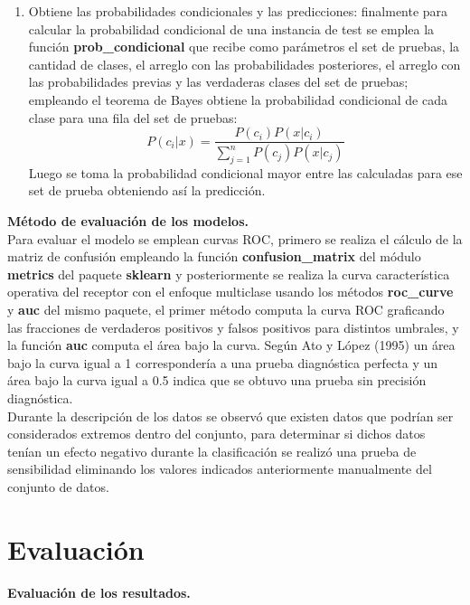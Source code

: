 \begin{enumerate}
	\item Obtiene las probabilidades condicionales y las predicciones:
	finalmente para calcular la probabilidad condicional de una instancia de test se emplea la función
	\textbf{prob\_condicional} que recibe como parámetros el set de pruebas, la cantidad de clases, el
	arreglo con las probabilidades posteriores, el arreglo con las probabilidades previas y las verdaderas
	clases del set de pruebas; empleando el teorema de Bayes obtiene la probabilidad condicional de cada
	clase para una fila del set de pruebas:
	\[P\left(c_{i}|x\right)=
	\frac{P\left(c_{i}\right)P\left(x|c_{i}\right)}{\sum_{j=1}^{n}P\left(c_{j}\right)P\left(x|c_{j}\right)}
	\]
	Luego se toma la probabilidad condicional mayor entre las calculadas para ese set de prueba
	obteniendo así la predicción.
\end{enumerate}

\noindent
\textbf{Método de evaluación de los modelos.}\\

Para evaluar el modelo se emplean curvas ROC, primero se realiza el cálculo de la matriz de confusión empleando la función
\textbf{confusion\_matrix} del módulo \textbf{metrics} del paquete \textbf{sklearn}
y posteriormente se realiza la curva característica operativa del receptor con el enfoque multiclase usando los métodos
\textbf{roc\_curve} y \textbf{auc} del mismo paquete, el primer método computa la curva ROC graficando las fracciones de
verdaderos positivos y falsos positivos para distintos umbrales, y la función \textbf{auc} computa el área bajo la curva.
Según Ato y López (1995) un área bajo la curva igual a 1 correspondería a una prueba diagnóstica perfecta y un
área bajo la curva igual a 0.5 indica que se obtuvo una prueba sin precisión diagnóstica.\\

Durante la descripción de los datos se observó que existen datos que podrían ser considerados extremos dentro del conjunto, para determinar si dichos datos tenían un efecto negativo durante la clasificación se realizó una prueba de sensibilidad eliminando los valores indicados anteriormente manualmente del conjunto de datos.

\section{Evaluación}

\noindent
\textbf{Evaluación de los resultados.}\\


